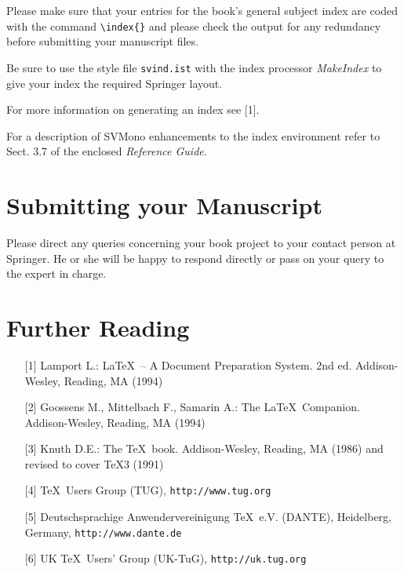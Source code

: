\documentclass[graybox]{svmono}
\begin{document}
Please make sure that your entries for the book's general subject index are coded with the command \verb|\index{}| and please check the output for any redundancy before submitting your manuscript files.

Be sure to use the style file \verb|svind.ist| with the index processor {\it MakeIndex} to give your index the required Springer layout.

For more information on generating an index see [1].

For a description of {\sc SVMono} enhancements to the index environment refer to Sect. 3.7 of the enclosed {\it Reference Guide}.


\section{ Submitting your Manuscript}

Please direct any queries concerning your book project to your contact person at Springer. He or she will be happy to respond directly or pass on your query to the expert  in charge.

\eject

\section*{Further Reading}

\begin{enumerate}
\item[{[1]}] Lamport L.: \LaTeX~-- A Document Preparation System. 2nd ed. Addison-Wesley, Reading, MA (1994)
\item[{[2]}] Goossens M., Mittelbach F., Samarin A.: The \LaTeX~Companion. Addison-Wesley, Reading, MA (1994)
\item[{[3]}] Knuth D.E.: The \TeX~book. Addison-Wesley, Reading, MA (1986) and revised to cover \TeX3 (1991)
\item[{[4]}] \TeX~Users Group (TUG), \texttt{http://www.tug.org}
\item[{[5]}] Deutschsprachige Anwendervereinigung \TeX~e.V. (DANTE), Heidelberg, Germany, \texttt{http://www.dante.de}
\item[{[6]}] UK \TeX~Users' Group (UK-TuG), \texttt{http://uk.tug.org}
\end{enumerate}

\def\indexname{Subject Index}

\end{document}
